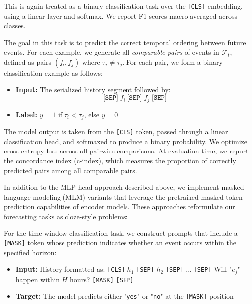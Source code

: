 This is again treated as a binary classification task over the \texttt{[CLS]} embedding, using a linear layer and softmax.
We report F1 scores macro-averaged across classes.

The goal in this task is to predict the correct temporal ordering between future events.
For each example, we generate all \emph{comparable pairs} of events in $\mathcal{F}_t$, defined as pairs $(f_i, f_j)$ where $\tau_i \neq \tau_j$.
For each pair, we form a binary classification example as follows:

\begin{itemize}
    \item \textbf{Input:} The serialized history segment followed by:
    \begin{equation}
        \texttt{[SEP]} \; f_i \; \texttt{[SEP]} \; f_j \; \texttt{[SEP]}
    \end{equation}
    \item \textbf{Label:} $y = 1$ if $\tau_i < \tau_j$, else $y = 0$
\end{itemize}

The model output is taken from the \texttt{[CLS]} token, passed through a linear classification head, and softmaxed to produce a binary probability.
We optimize cross-entropy loss across all pairwise comparisons.
At evaluation time, we report the concordance index (c-index), which measures the proportion of correctly predicted pairs among all comparable pairs.

In addition to the MLP-head approach described above, we implement masked language modeling (MLM) variants that leverage the pretrained masked token prediction capabilities of encoder models.
These approaches reformulate our forecasting tasks as cloze-style problems:

For the time-window classification task, we construct prompts that include a \texttt{[MASK]} token whose prediction indicates whether an event occurs within the specified horizon:

\begin{itemize}
    \item \textbf{Input:} History formatted as: \texttt{[CLS]} $h_1$ \texttt{[SEP]} $h_2$ \texttt{[SEP]} ... \texttt{[SEP]} Will "$e_j$" happen within $H$ hours? \texttt{[MASK]} \texttt{[SEP]}
    \item \textbf{Target:} The model predicts either "\texttt{yes}" or "\texttt{no}" at the \texttt{[MASK]} position
\end{itemize}


